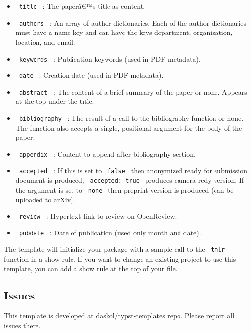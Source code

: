 \begin{itemize}
\tightlist
\item
  \texttt{\ title\ } : The paperâ€™s title as content.
\item
  \texttt{\ authors\ } : An array of author dictionaries. Each of the
  author dictionaries must have a name key and can have the keys
  department, organization, location, and email.
\item
  \texttt{\ keywords\ } : Publication keywords (used in PDF metadata).
\item
  \texttt{\ date\ } : Creation date (used in PDF metadata).
\item
  \texttt{\ abstract\ } : The content of a brief summary of the paper or
  none. Appears at the top under the title.
\item
  \texttt{\ bibliography\ } : The result of a call to the bibliography
  function or none. The function also accepts a single, positional
  argument for the body of the paper.
\item
  \texttt{\ appendix\ } : Content to append after bibliography section.
\item
  \texttt{\ accepted\ } : If this is set to \texttt{\ false\ } then
  anonymized ready for submission document is produced;
  \texttt{\ accepted:\ true\ } produces camera-redy version. If the
  argument is set to \texttt{\ none\ } then preprint version is produced
  (can be uploaded to arXiv).
\item
  \texttt{\ review\ } : Hypertext link to review on OpenReview.
\item
  \texttt{\ pubdate\ } : Date of publication (used only month and date).
\end{itemize}

The template will initialize your package with a sample call to the
\texttt{\ tmlr\ } function in a show rule. If you want to change an
existing project to use this template, you can add a show rule at the
top of your file.

\subsection{Issues}\label{issues}

This template is developed at
\href{https://github.com/daskol/typst-templates}{daskol/typst-templates}
repo. Please report all issues there.

